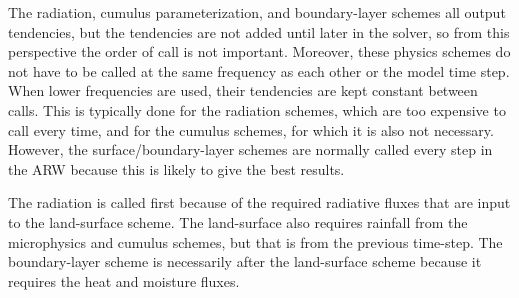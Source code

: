 The radiation, cumulus parameterization, and boundary-layer schemes all
output tendencies, but the tendencies are not added until later in the solver, so
from this perspective the order of call is not important. Moreover, these
physics schemes do not have to be called at the same frequency as each other
or the model time step. When lower frequencies are used, their tendencies
are kept constant between calls. This is typically done for the radiation schemes,
which are too expensive to call every time, and for the cumulus schemes, for
which it is also not necessary. However, the surface/boundary-layer schemes are
normally called every step in the ARW because this is likely to give the best results.

The radiation is called first because of the required radiative fluxes
that are input to the land-surface scheme. The land-surface also requires rainfall
from the microphysics and cumulus schemes, but that is from the previous time-step.
The boundary-layer scheme is necessarily after the land-surface scheme
because it requires the heat and moisture fluxes.

